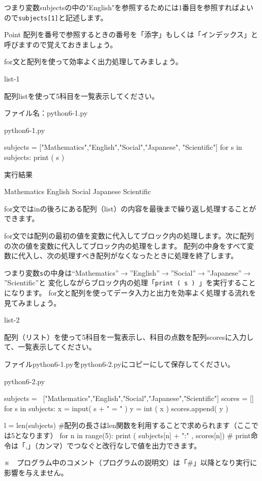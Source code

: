 \documentclass[11pt,a4paper,dvipdfmx,titlepage]{jsreport}
\begin{document}
つまり変数subjectsの中の"English"を参照するためには1番目を参照すればよいので{\tt subjects[1]}と記述します。

\begin{hipoint}{Point}
配列を番号で参照するときの番号を「添字」もしくは「インデックス」と呼びますので覚えておきましょう。
\end{hipoint}
\newpage
for文と配列を使って効率よく出力処理してみましょう。

\begin{pabox}{list-1}

配列listを使って5科目を一覧表示してください。

ファイル名：python6-1.py
\begin{legbox}{python6-1.py}
\begin{listing}{1}
subjects = ["Mathematics","English","Social","Japanese",
"Scientific"]
for s in subjects:
    print ( s )
\end{listing}
実行結果
\begin{listing}{1}
Mathematics
English
Social
Japanese
Scientific
\end{listing}
\end{legbox}
for文ではinの後ろにある配列（list）の内容を最後まで繰り返し処理することができます。
\end{pabox}
for文では配列の最初の値を変数に代入してブロック内の処理します。次に配列の次の値を変数に代入してブロック内の処理をします。
配列の中身をすべて変数に代入し、次の処理すべき配列がなくなったときに処理を終了します。

つまり変数{\tt s}の中身は“Mathematics”$\rightarrow$”English”$\rightarrow$”Social”$\rightarrow$”Japanese”$\rightarrow$”Scientific”と
変化しながらブロック内の処理「{\tt print ( s ) }」を実行することになります。
\newpage
for文と配列を使ってデータ入力と出力を効率よく処理する流れを見てみましょう。
\begin{pabox}{list-2}

配列（リスト）を使って5科目を一覧表示し、科目の点数を配列scoresに入力して、一覧表示してください。

ファイルpython6-1.pyをpython6-2.pyにコピーにして保存してください。
\begin{legbox}{python6-2.py}
\begin{listing}{1}
subjects = \
        ["Mathematics","English","Social","Japanese","Scientific"]
scores = [] 
for s in subjects:
    x = input( s + " = " )
    y = int ( x )
    scores.append( y )

l = len(subjects)
#配列の長さはlen関数を利用することで求められます（ここでは5となります）
for n in range(5):
    print ( subjects[n] + ":" , scores[n])
# print命令は「,」（カンマ）でつなぐと改行なしで値を出力できます。
\end{listing}
\end{legbox}

※　プログラム中のコメント（プログラムの説明文）は「\#」以降となり実行に影響を与えません。
\end{pabox}
\end{document}
